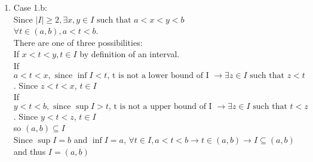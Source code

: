 \documentclass[12pt]{article}
\begin{document}
\begin{enumerate}
\begin{enumerate}
\item Case 1.b:\\
Since $|I| \geq 2, \exists x,y\in I \text{ such that } a<x<y<b$\\
$\forall t\in (a,b), a<t<b$.  \\
There are one of three possibilities:\\
If $x<t<y, t\in I$ by definition of an interval.\\
If $a < t < x, \text{ since $\inf I < t$, t is not a lower bound of I } \rightarrow \exists z\in I \text{ such that } z < t$.  Since $z<t<x$, $t\in I$\\
If $y < t < b, \text{ since $\sup I > t$, t is not a upper bound of I } \rightarrow \exists z\in I \text{ such that } t < z$.  Since $y<t<z$, $t\in I$\\
so $(a,b) \subseteq I$\\
Since $\sup I = b$ and $\inf I = a$, $\forall t\in I, a<t<b \rightarrow t\in (a,b) \rightarrow I \subseteq (a,b)$ and thus $I=(a,b)$


\end{enumerate}
\end{enumerate}
\end{document}
